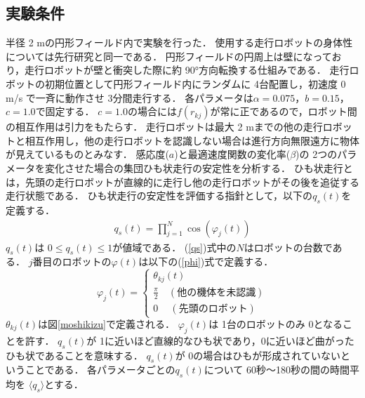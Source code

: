\documentclass[twocolumn]{jarticle} %
\begin{document}
\subsection{実験条件}
半径 2 mの円形フィールド内で実験を行った．
使用する走行ロボットの身体性については先行研究\cite{kawano}と同一である．
円形フィールドの円周上は壁になっており，走行ロボットが壁と衝突した際に約 90°方向転換する仕組みである．
走行ロボットの初期位置として円形フィールド内にランダムに 4台配置し，初速度 0 m/s で一斉に動作させ 3分間走行する．
各パラメータは$\alpha = 0.075$，$b = 0.15$，$c = 1.0$で固定する．
$c = 1.0$の場合には$f(r_{kj})$が常に正であるので，ロボット間の相互作用は引力をもたらす．
走行ロボットは最大 2 mまでの他の走行ロボットと相互作用し，他の走行ロボットを認識しない場合は進行方向無限遠方に物体が見えているものとみなす．
感応度($a$)と最適速度関数の変化率($\beta$)の 2つのパラメータを変化させた場合の集団ひも状走行の安定性を分析する．
ひも状走行とは，先頭の走行ロボットが直線的に走行し他の走行ロボットがその後を追従する走行状態である．
ひも状走行の安定性を評価する指針として，以下の$q_s\left(t\right)$を定義する．
\begin{eqnarray}
q_s\left(t\right) = \prod_{j=1}^{N}\cos\left(\varphi_{j}\left(t\right) \right)
\label{qs}
\end{eqnarray}
$q_s \left(t\right)$は $ 0 \leq q_s \left(t\right) \leq 1$が値域である．
(\ref{qs})式中の$N$はロボットの台数である．
$j$番目のロボットの$\varphi\left(t\right)$は以下の(\ref{phi})式で定義する．
\begin{equation}
  \varphi_{j}\left(t\right) = \left \{
  \begin{array}{l}
    \theta_{kj}\left(t\right) \\
    \frac{\pi}{2}\quad(他の機体を未認識) \\
    0 \quad\ (先頭のロボット)
   \end{array}
   \right.   
\label{phi}
\end{equation}
$\theta_{kj}\left(t\right)$は図\ref{moshikizu}で定義される．
$\varphi_j\left(t\right)$は 1台のロボットのみ 0となることを許す．
$q_s\left( t \right)$が 1に近いほど直線的なひも状であり，0に近いほど曲がったひも状であることを意味する．
$q_s\left( t \right)$が 0の場合はひもが形成されていないということである．
各パラメータごとの$q_s\left(t\right)$について 60秒〜180秒の間の時間平均を $\langle q_s \rangle$とする．
\end{document}
